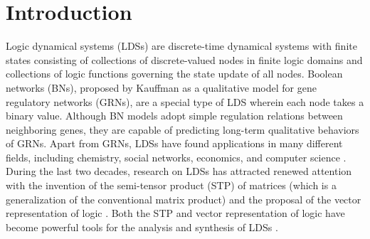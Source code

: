 \documentclass[11pt,onecolumn]{article}
\begin{document}
	\section{Introduction}

Logic dynamical systems (LDSs) are discrete-time dynamical systems with finite states consisting of collections of discrete-valued nodes in finite logic domains and collections of logic functions governing the state update of all nodes. Boolean networks (BNs), proposed by Kauffman as a qualitative model for gene regulatory networks (GRNs)\cite{kauffman1969metabolic}, are a special type of LDS wherein each node takes a binary value. Although BN models adopt simple regulation relations between neighboring genes, they are capable of predicting long-term qualitative behaviors of GRNs. Apart from GRNs, LDSs have found applications in many different fields, including chemistry, social networks, economics, and computer science \cite{akutsu1999identification, albert2000dynamics,shmulevich2002probabilistic, shmulevich2002boolean, aldana2003boolean, heidel2003finding, akutsu2007control}. During the last two decades, research on LDSs has attracted renewed attention with the invention of the semi-tensor product (STP) of matrices (which is a generalization of the conventional matrix product) and the proposal of the vector representation of logic \cite{cheng2011analysis}. Both the STP and vector representation of logic have become powerful tools for the analysis and synthesis of LDSs \cite{cheng2011stability, qi2010stabilization,Li2014stability, cheng2009controllability, li2011controllabilityProb, li2012complete, Chen2017Synchronization1, cheng2011disturbance, cheng2011identification, laschov2011maximum, Liu2017Pinning,zhao2011optimal}.
\end{document}

